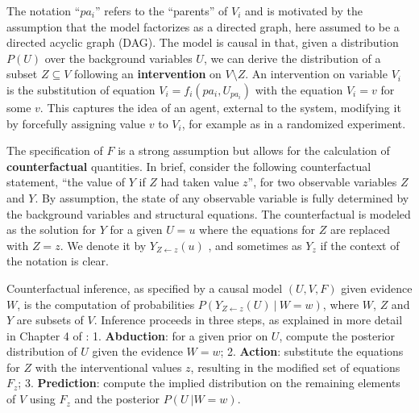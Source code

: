 The notation ``$pa_i$'' refers to the ``parents'' of $V_i$ and is
motivated by the assumption that the model factorizes as a directed
graph, here assumed to be a directed acyclic graph (DAG).  The model
is causal in that, given a distribution $P(U)$ over the background
variables $U$, we can derive the distribution of a subset $Z \subseteq
V$ following an {\bf intervention} on $V\setminus Z$.  An 
  intervention on variable $V_i$ is the substitution of equation $V_i
= f_i(pa_i, U_{pa_i})$ with the equation $V_i = v$ for some $v$. This
captures the idea of an agent, external to the system, modifying it by
forcefully assigning value $v$ to $V_i$,
for example as in a randomized experiment.

The specification of $F$ is a strong assumption but allows for the
calculation of {\bf counterfactual} quantities.  In brief, consider
the following counterfactual statement, ``the value of $Y$ if $Z$ had
taken value $z$'', for two observable variables $Z$ and $Y$. By
assumption, the state of any observable variable is fully determined
by the background variables and structural equations. The
counterfactual is modeled as the solution for $Y$ for a given $U = u$
where the equations for $Z$ are replaced with $Z \!=\!  z$.  We denote
it by $Y_{Z \leftarrow z}(u)$ \cite{pearl:00}, and sometimes as $Y_z$
if the context of the notation is clear.

Counterfactual inference, as specified by a causal model $(U, V, F)$
given evidence $W$, is the computation of probabilities $P(Y_{Z
  \leftarrow z}(U)\ |\ W \!=\! w)$, where $W$, $Z$ and $Y$ are subsets
of $V$. Inference proceeds in three steps, as explained in more detail
in Chapter 4 of \citet{pearl:16}: 1. {\bf Abduction}: for a given
prior on $U$, compute the posterior distribution of $U$ given the
evidence $W = w$; 2. {\bf Action}: substitute the equations for $Z$
with the interventional values $z$, resulting in the modified set of
equations $F_z$; 3. {\bf Prediction}: compute the implied distribution
on the remaining elements of $V$ using $F_z$ and the posterior $P(U\ |
W = w)$.




